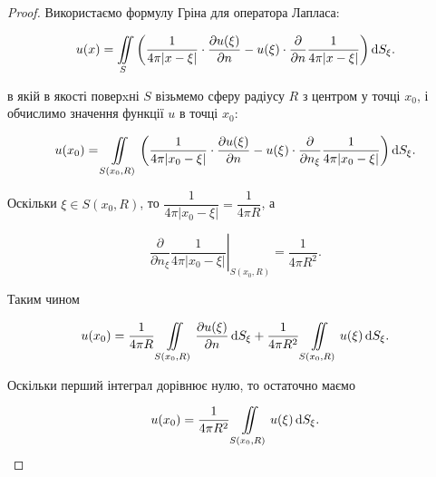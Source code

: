 \begin{proof}
	Використаємо формулу Гріна для оператора Лапласа:

	\begin{equation}
		u(x) = \displaystyle\iint\limits_S \left( \frac{1}{4 \pi |x - \xi|} \cdot \frac{\partial u(\xi)}{\partial n} - u(\xi) \cdot \frac{\partial}{\partial n} \frac{1}{4 \pi |x - \xi|} \right) \mathop{}\!\mathrm{d} S_\xi.
	\end{equation}

	в якій в якості поверxні $S$ візьмемо сферу радіусу $R$ з центром у точці $x_0$, і обчислимо значення функції $u$ в точці $x_0$:

	\begin{equation}
		u(x_0) = \displaystyle\iint\limits_{S(x_0, R)} \left( \frac{1}{4 \pi |x_0 - \xi|} \cdot \frac{\partial u(\xi)}{\partial n} - u(\xi) \cdot \frac{\partial}{\partial n_\xi} \frac{1}{4 \pi |x_0 - \xi|} \right) \mathop{}\!\mathrm{d} S_\xi.
	\end{equation}
	 
	Оскільки $\xi \in S(x_0, R)$, то $\dfrac{1}{4 \pi |x_0 - \xi|} = \dfrac{1}{4 \pi R}$, а

	\begin{equation}
		\left. \frac{\partial}{\partial n_\xi} \frac{1}{4 \pi |x_0 - \xi|} \right|_{S(x_0, R)} = \frac{1}{4 \pi R^2}.
	\end{equation}

	Таким чином 

	\begin{equation}
		u(x_0) = \frac{1}{4 \pi R} \displaystyle\iint\limits_{S(x_0, R)} \frac{\partial u(\xi)}{\partial n} \mathop{}\!\mathrm{d} S_\xi + \frac{1}{4 \pi R^2} \displaystyle\iint\limits_{S(x_0, R)} u(\xi) \mathop{}\!\mathrm{d} S_\xi.
	\end{equation}

	Оскільки перший інтеграл дорівнює нулю, то остаточно маємо

	\begin{equation}
		u(x_0) = \frac{1}{4 \pi R^2} \displaystyle\iint\limits_{S(x_0, R)} u(\xi) \mathop{}\!\mathrm{d} S_\xi .
	\end{equation}
\end{proof}

